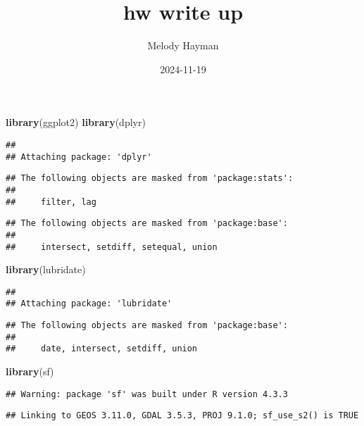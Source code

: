 \documentclass[
]{article}
\title{hw write up}
\author{Melody Hayman}
\date{2024-11-19}
\newenvironment{Shaded}{\begin{snugshade}}{\end{snugshade}}
\newcommand{\FunctionTok}[1]{\textcolor[rgb]{0.13,0.29,0.53}{\textbf{#1}}}
\newcommand{\NormalTok}[1]{#1}
\begin{document}
\maketitle

\begin{Shaded}
\begin{Highlighting}[]
\FunctionTok{library}\NormalTok{(ggplot2)}
\FunctionTok{library}\NormalTok{(dplyr)}
\end{Highlighting}
\end{Shaded}

\begin{verbatim}
## 
## Attaching package: 'dplyr'
\end{verbatim}

\begin{verbatim}
## The following objects are masked from 'package:stats':
## 
##     filter, lag
\end{verbatim}

\begin{verbatim}
## The following objects are masked from 'package:base':
## 
##     intersect, setdiff, setequal, union
\end{verbatim}

\begin{Shaded}
\begin{Highlighting}[]
\FunctionTok{library}\NormalTok{(lubridate)}
\end{Highlighting}
\end{Shaded}

\begin{verbatim}
## 
## Attaching package: 'lubridate'
\end{verbatim}

\begin{verbatim}
## The following objects are masked from 'package:base':
## 
##     date, intersect, setdiff, union
\end{verbatim}

\begin{Shaded}
\begin{Highlighting}[]
\FunctionTok{library}\NormalTok{(sf)}
\end{Highlighting}
\end{Shaded}

\begin{verbatim}
## Warning: package 'sf' was built under R version 4.3.3
\end{verbatim}

\begin{verbatim}
## Linking to GEOS 3.11.0, GDAL 3.5.3, PROJ 9.1.0; sf_use_s2() is TRUE
\end{verbatim}
\end{document}
